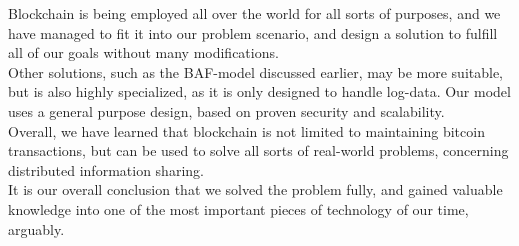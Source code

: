 
Blockchain is being employed all over the world for all sorts of purposes, and we have managed to fit it into our problem scenario, and design a solution to fulfill all of our goals without many modifications. 
\\Other solutions, such as the BAF-model discussed earlier, may be more suitable, but is also highly specialized, as it is only designed to handle log-data. Our model uses a general purpose design, based on proven security and scalability.
\\Overall, we have learned that blockchain is not limited to maintaining bitcoin transactions, but can be used to solve all sorts of real-world problems, concerning distributed information sharing. 
\\It is our overall conclusion that we solved the problem fully, and gained valuable knowledge into one of the most important pieces of technology of our time, arguably.
